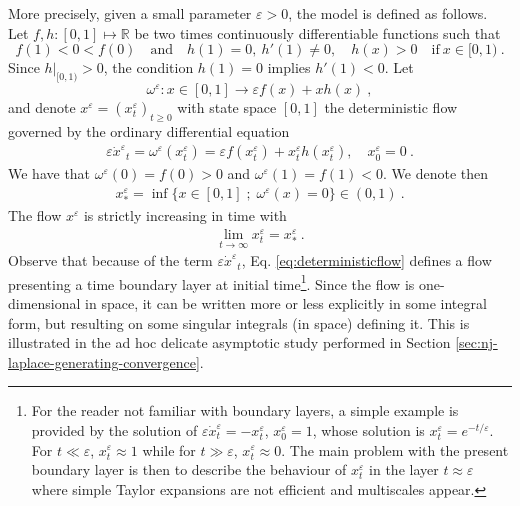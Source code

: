 \documentclass[reqno, 12pt, a4paper]{amsart}
\theoremstyle{plain}
\theoremstyle{definition}
\begin{document}
More precisely, given a small parameter $\varepsilon>0$, the model is defined as follows. Let $f,h:[0,1] \mapsto \mathbb R$ be two times continuously differentiable functions such that
\begin{equation}
\label{eq:FH}
    f(1) < 0 < f(0) \quad  \text{and} \quad h(1) =0, \ h'(1) \ne 0,  \quad h(x)>0  \quad \text{if} \ x\in [0,1) \ .
\end{equation}
Since $h \vert_{[0,1)} > 0$, the condition $h(1)=0$ implies $h' (1)<0$. Let 
\begin{equation}
\omega^{\varepsilon}: x \in [0,1] \to \varepsilon f(x) + x h(x) \ ,
\end{equation}
and denote ${x}^\varepsilon =({x}^\varepsilon_t)_{t \ge 0}$  with state space $[0,1]$ the deterministic flow governed by the ordinary differential equation
\begin{equation}
\label{eq:deterministicflow}
\begin{split}
\varepsilon {\dot x^\varepsilon}_t = \omega^\varepsilon (x_t^\varepsilon) =\varepsilon f(x_t^\varepsilon) + x_t^\varepsilon h(x_t^\varepsilon), \quad x^\varepsilon_0=0 \ .
\end{split}
\end{equation}
We have that $\omega^\varepsilon (0)=f(0)>0$ and $\omega^\varepsilon (1)=f(1)<0$. We denote then
\begin{equation}
\begin{split}
x^\varepsilon_*= \inf\{ x \in [0,1] \; ; \; \omega^\varepsilon (x)= 0 \}  \in (0,1) \ .
\end{split}
\end{equation}
The flow $x^\varepsilon$ is strictly increasing in time with 
\begin{equation}
\begin{split}
\lim_{t \to \infty} x^\varepsilon_t =x^\varepsilon_* \ .
\end{split}
\end{equation}
Observe that because of the term $\varepsilon {\dot x^\varepsilon}_t$, Eq. \eqref{eq:deterministicflow} defines a flow presenting a time boundary layer at initial time{\footnote{For the reader not familiar with boundary layers, a simple example is provided by the solution of $\varepsilon \dot x_t^\varepsilon =-x_t^\varepsilon$, $x_0^\varepsilon=1$, whose solution is $x_t^\varepsilon=e^{-t/\varepsilon}$. For $t \ll \varepsilon$, $x_t^\varepsilon \approx 1$ while for $t \gg \varepsilon$, $x_t^\varepsilon \approx 0$. The main problem with the present boundary layer is then to describe the behaviour of $x_t^\varepsilon$ in the layer $ t \approx \varepsilon $ where simple Taylor expansions are not efficient and multiscales appear.}}. Since the flow is one-dimensional in space, it can be written more or less explicitly in some integral form, but resulting on some singular integrals (in space) defining it. This is illustrated in the ad hoc delicate asymptotic study performed in Section \ref{sec:nj-laplace-generating-convergence}.
\end{document}
